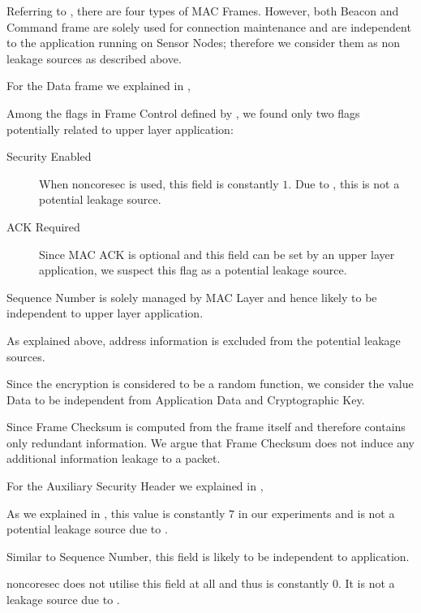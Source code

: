 Referring to , there are four types of MAC Frames. However, both Beacon and Command frame are solely used for connection maintenance and are independent to the application running on Sensor Nodes; therefore we consider them as non leakage sources as described above.

For the Data frame we explained in ,
\begin{description}[style=nextline]
	\item[Frame Control]
	Among the flags in Frame Control defined by \cite{802154}, we found only two flags potentially related to upper layer application:
		\begin{description}
			\item[Security Enabled]
			When noncoresec is used, this field is constantly $1$. Due to , this is not a potential leakage source.
			\item[ACK Required]
			Since MAC ACK is optional and this field can be set by an upper layer application, we suspect this flag as a potential leakage source.
		\end{description}
	\item[Sequence Number]
	Sequence Number is solely managed by MAC Layer and hence likely to be independent to upper layer application.
	\item[Address Information]
	As explained above, address information is excluded from the potential leakage sources.
	\item[Data]
	Since the encryption is considered to be a random function, we consider the value Data to be independent from Application Data and Cryptographic Key.
	\item[Frame Checksum]
	Since Frame Checksum is computed from the frame itself and therefore contains only redundant information. We argue that Frame Checksum does not induce any additional information leakage to a packet.
\end{description}

For the Auxiliary Security Header we explained in ,

\begin{description}[style=nextline]
	\item[Security Level]
	As we explained in , this value is constantly $7$ in our experiments and is not a potential leakage source due to .
	\item[Frame Counter]
	Similar to Sequence Number, this field is likely to be independent to application.
	\item[Key Strategy]
	noncoresec does not utilise this field at all and thus is constantly $0$. It is not a leakage source due to .
\end{description}

